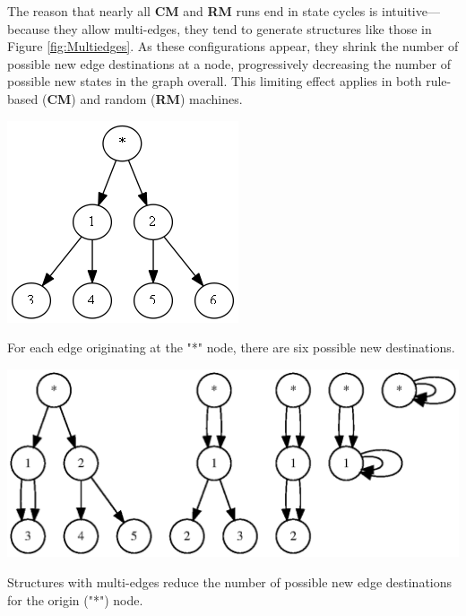 \documentclass{tufte-handout}
\begin{document}
The reason that nearly all \textbf{CM} and \textbf{RM} runs end in state cycles is
intuitive---because they allow multi-edges, they tend to generate structures
like those in Figure \ref{fig:Multiedges}. As these configurations appear, they 
shrink the number of possible new edge destinations at a node, progressively decreasing the
number of possible new states in the graph overall. This limiting effect
applies in both rule-based (\textbf{CM}) and random (\textbf{RM}) machines.

\begin{marginfigure}
\includegraphics[scale=0.3]{sixchoices.png}
\caption{For each edge originating at the "*" node, there are six possible new destinations.}
\label{fig:Multiedges}
\end{marginfigure}

\begin{marginfigure}
\vspace{2mm}
\includegraphics{multiedges.ps}
\caption{Structures with multi-edges reduce the number of possible new edge destinations for
the origin ("*") node.}
\label{fig:Multiedges}
\end{marginfigure}

\clearpage
\end{document}
